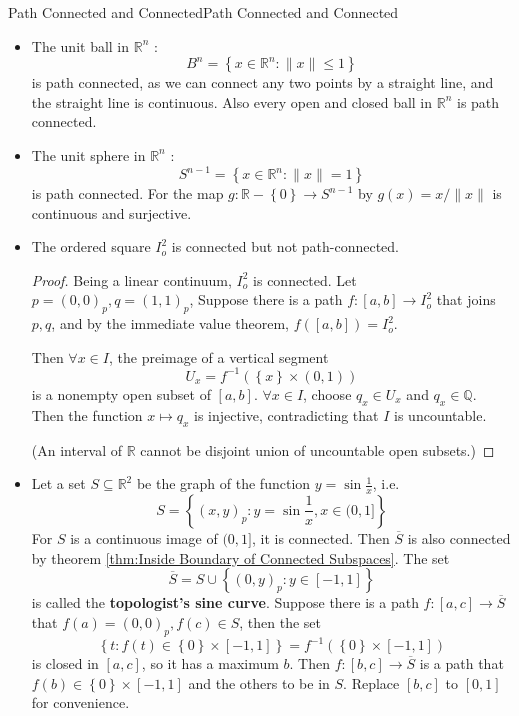\documentclass[../main.tex]{subfiles}
\begin{document}
\begin{example}{Path Connected and Connected}{Path Connected and Connected}
\begin{itemize}
\item The unit ball in $\mathbb{R}^n$ :
	\begin{equation*}
	B^n = \left\{ x\in \mathbb{R}^n : \|x\|\leq 1 \right\}
	\end{equation*}
	is path connected, as we can connect any two points by a straight line, and the straight line is continuous. Also every open and closed ball in $\mathbb{R}^n$ is path connected.
\item The unit sphere in $\mathbb{R}^n$ :
	\begin{equation*}
	S^{n-1} = \left\{ x\in \mathbb{R}^n : \|x\| = 1 \right\}
	\end{equation*}
	is path connected. For the map $g: \mathbb{R}-\left\{ 0 \right\} \rightarrow S^{n-1}$ by $g(x) = x / \|x\|$ is continuous and surjective.
\item The ordered square $I_o^2$ is connected but not path-connected.
\begin{proof}
	Being a linear continuum, $I_o^2$ is connected. Let $p=(0,0)_p,q=(1,1)_p$, Suppose there is a path $f: [a,b] \rightarrow I_o^2$ that joins $p,q$, and by the immediate value theorem, $f([a,b]) = I_o^2$.

	Then $\forall x\in I$, the preimage of a vertical segment
	\begin{equation*}
	U_x = f^{-1}(\left\{ x \right\} \times (0,1))
	\end{equation*}
	is a nonempty open subset of $[a,b]$. $\forall x\in I$, choose $q_x\in U_x$ and $q_x\in \mathbb{Q}$. Then the function $x \mapsto q_x$ is injective, contradicting that $I$ is uncountable.

	(An interval of $\mathbb{R}$ cannot be disjoint union of uncountable open subsets.)
\end{proof}
\item Let a set $S \subseteq \mathbb{R}^2$ be the graph of the function $y = \sin \frac{1}{x}$, i.e.
	\begin{equation*}
	S = \left\{ (x,y)_p : y=\sin \frac{1}{x},x\in (0,1]\right\}
	\end{equation*}
	For $S$ is a continuous image of $(0,1]$, it is connected. Then $\overline{S}$ is also connected by theorem \ref{thm:Inside Boundary of Connected Subspaces}. The set
	\begin{equation*}
	\overline{S} = S \cup \left\{ (0,y)_p : y\in [-1,1] \right\}
	\end{equation*}
	is called the \textbf{topologist's sine curve}. Suppose there is a path $f: [a,c] \rightarrow \overline{S}$ that $f(a) = (0,0)_p,f(c)\in S $, then the set
	\begin{equation*}
		\left\{ t: f(t)\in \left\{ 0 \right\} \times [-1,1] \right\} = f^{-1}\left( \left\{ 0 \right\} \times [-1,1] \right)
	\end{equation*}
	is closed in $[a,c]$, so it has a maximum $b$. Then $f: [b,c] \rightarrow \overline{S}$ is a path that $f(b)\in \left\{ 0 \right\}\times [-1,1]$ and the others to be in $S$. Replace $[b,c]$ to  $[0,1]$ for convenience.


\end{itemize}
\end{example}
\end{document}
